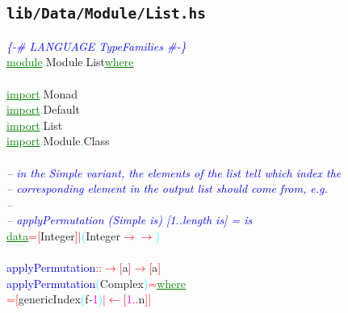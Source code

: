 \subsection{\texttt{lib/Data/Module/List.hs}}
\label{mod:Data.Module.List}
\textcolor{blue}{{\it{}\{-\# LANGUAGE TypeFamilies \#-\}}}\\\textcolor{green}{\underline{module}}\textcolor{cyan}{.}{\rm{}Module}\textcolor{cyan}{.}{\rm{}List}\hsspace \textcolor{green}{\underline{where}}\\\\\textcolor{green}{\underline{import}}\textcolor{cyan}{.}{\rm{}Monad}\\\textcolor{green}{\underline{import}}\textcolor{cyan}{.}{\rm{}Default}\\\textcolor{green}{\underline{import}}\textcolor{cyan}{.}{\rm{}List}\\\textcolor{green}{\underline{import}}\textcolor{cyan}{.}{\rm{}Module}\textcolor{cyan}{.}{\rm{}Class}\\\\\textcolor{blue}{{\it{}-- in the Simple variant, the elements of the list tell which index the}}\\\textcolor{blue}{{\it{}-- corresponding element in the output list should come from, e.g.}}\\\textcolor{blue}{{\it{}--}}\\\textcolor{blue}{{\it{}-- applyPermutation (Simple is) [1..length is] = is}}\\\textcolor{green}{\underline{data}}\hsspace \textcolor{red}{=}\hsspace \textcolor{red}{[}{\rm{}Integer}\textcolor{red}{]}\hsspace \textcolor{red}{\ensuremath{|}}\hsspace \textcolor{cyan}{(}{\rm{}Integer}\hsspace \textcolor{red}{\ensuremath{\rightarrow}}\hsspace \textcolor{red}{\ensuremath{\rightarrow}}\textcolor{cyan}{)}\\\\\textcolor{blue}{applyPermutation}\hsspace \textcolor{red}{::}\hsspace \textcolor{red}{\ensuremath{\rightarrow}}\hsspace \textcolor{red}{[}{\rm{}a}\textcolor{red}{]}\hsspace \textcolor{red}{\ensuremath{\rightarrow}}\hsspace \textcolor{red}{[}{\rm{}a}\textcolor{red}{]}\\\textcolor{blue}{applyPermutation}\hsspace \textcolor{cyan}{(}{\rm{}Complex}\textcolor{cyan}{)}\hsspace \textcolor{red}{=}\hsspace \textcolor{green}{\underline{where}}\\\hsspace \textcolor{red}{=}\hsspace \textcolor{red}{[}{\rm{}genericIndex}\hsspace \textcolor{cyan}{(}{\rm{}f}\hsspace \textcolor{blue}{{\it{}-}}\hsspace \textcolor{magenta}{1}\textcolor{cyan}{)}\hsspace \textcolor{red}{\ensuremath{|}}\hsspace \textcolor{red}{\ensuremath{\leftarrow}}\hsspace \textcolor{red}{[}\textcolor{magenta}{1}\textcolor{red}{..}{\rm{}n}\textcolor{red}{]}\textcolor{red}{]}\\\hsspace 